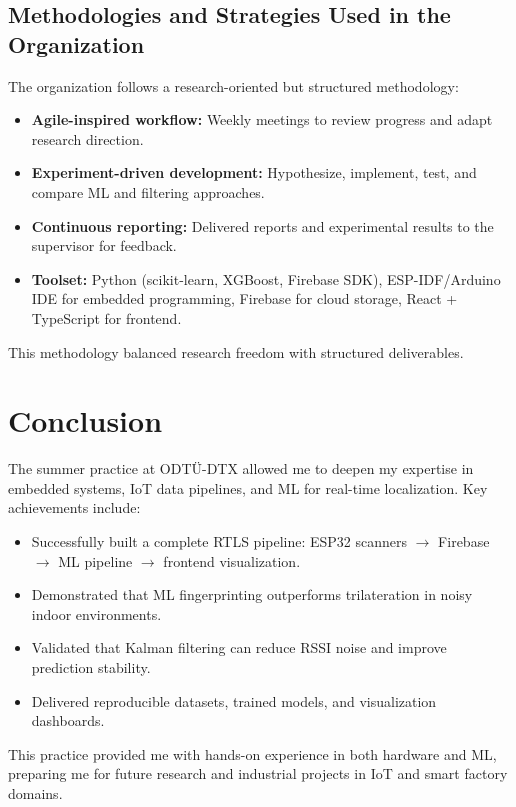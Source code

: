 \documentclass[a4paper,12pt]{report}
\begin{document}
\section{Methodologies and Strategies Used in the Organization}
The organization follows a research-oriented but structured methodology:
\begin{itemize}
    \item \textbf{Agile-inspired workflow:} Weekly meetings to review progress and adapt research direction.
    \item \textbf{Experiment-driven development:} Hypothesize, implement, test, and compare ML and filtering approaches.
    \item \textbf{Continuous reporting:} Delivered reports and experimental results to the supervisor for feedback.
    \item \textbf{Toolset:} Python (scikit-learn, XGBoost, Firebase SDK), ESP-IDF/Arduino IDE for embedded programming, Firebase for cloud storage, React + TypeScript for frontend.
\end{itemize}

This methodology balanced research freedom with structured deliverables.

\chapter{Conclusion}
The summer practice at ODTÜ-DTX allowed me to deepen my expertise in embedded systems, IoT data pipelines, and ML for real-time localization.  
Key achievements include:
\begin{itemize}
    \item Successfully built a complete RTLS pipeline: ESP32 scanners $\rightarrow$ Firebase $\rightarrow$ ML pipeline $\rightarrow$ frontend visualization.
    \item Demonstrated that ML fingerprinting outperforms trilateration in noisy indoor environments.
    \item Validated that Kalman filtering can reduce RSSI noise and improve prediction stability.
    \item Delivered reproducible datasets, trained models, and visualization dashboards.
\end{itemize}

This practice provided me with hands-on experience in both hardware and ML, preparing me for future research and industrial projects in IoT and smart factory domains.
\end{document}
